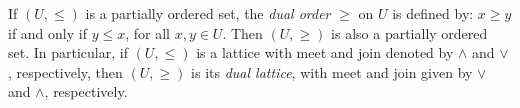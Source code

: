 If $(U, \leq)$ is a partially ordered set, the \textit{dual order} $\geq$ on $U$ is defined by: $x \geq y$ if and only if $y \leq x$, for all $x, y \in U$. Then $(U, \geq)$ is also a partially ordered set. In particular, if $(U, \leq)$ is a lattice with meet and join denoted by $\wedge$ and $\vee$, respectively, then $(U, \geq)$ is its \textit{dual lattice}, with meet and join given by $\vee$ and $\wedge$, respectively.
